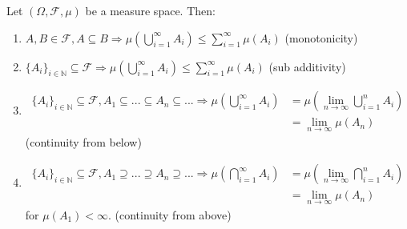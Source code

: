 \documentclass{article}
\begin{document}
	\begin{myprop}{}{}
		Let $(\Omega, \mathcal{F}, \mu)$ be a measure space. Then:
		\begin{enumerate}
			\item $A, B\in\mathcal{F}, A\subseteq B\Rightarrow\mu(\bigcup_{i=1}^{\infty}A_i)\leq\sum_{i=1}^{\infty}\mu(A_i)$ (monotonicity)
			\item $\{A_i\}_{i\in\mathbb{N}}\subseteq\mathcal{F}\Rightarrow\mu(\bigcup_{i=1}^{\infty}A_i)\leq\sum_{i=1}^{\infty}\mu(A_i)$ (sub additivity)
			\item \begin{align*}
				\{A_i\}_{i\in\mathbb{N}}\subseteq\mathcal{F}, A_1\subseteq...\subseteq A_n\subseteq...\Rightarrow\mu(\bigcup_{i=1}^{\infty}A_i)&=\mu(\lim_{n\to\infty}\bigcup_{i=1}^{n}A_i)\\
				&=\lim_{n\to\infty}\mu(A_n)
			\end{align*}
			(continuity from below)
			\item \begin{align*}
				\{A_i\}_{i\in\mathbb{N}}\subseteq\mathcal{F}, A_1\supseteq...\supseteq A_n\supseteq...\Rightarrow\mu(\bigcap_{i=1}^{\infty}A_i)&=\mu(\lim_{n\to\infty}\bigcap_{i=1}^{n}A_i)\\
				&=\lim_{n\to\infty}\mu(A_n)
			\end{align*} for $\mu(A_1)<\infty$.
			(continuity from above)
		\end{enumerate}
		

\end{myprop}
\end{document}
